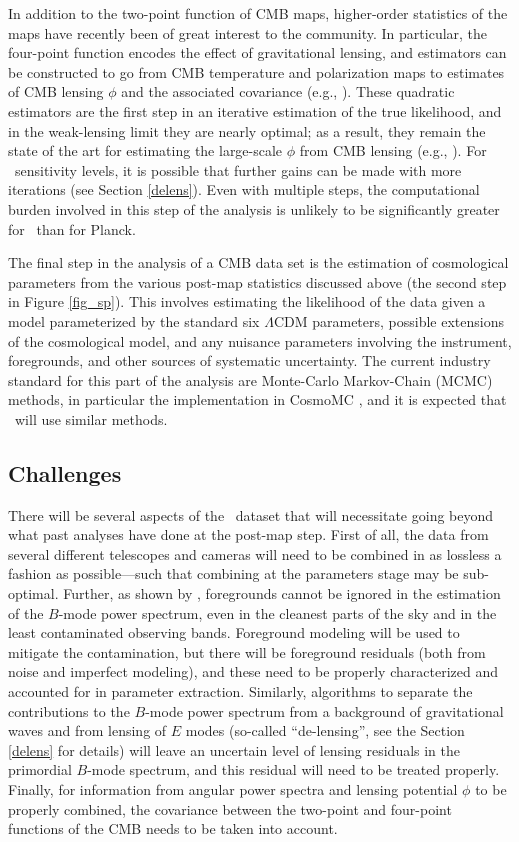 In addition to the two-point function of CMB maps, higher-order statistics of the maps have recently 
been of great interest to the community. In particular, the four-point function encodes the effect of 
gravitational lensing, and estimators can be constructed to go from CMB temperature and polarization
maps to estimates of CMB lensing $\phi$ and the associated covariance (e.g., \cite{Hu:2001kj,Okamoto:2003zw}).
These quadratic estimators are the first step in an iterative estimation of the true likelihood, and in
the weak-lensing limit they are nearly optimal; as a result, they remain the state of the art for estimating
the large-scale $\phi$ from CMB lensing (e.g., \cite{Ade:2013lta}). For \cmbexp\ sensitivity levels, 
it is possible that further gains can be made with more iterations (see Section \ref{delens}).
Even with multiple steps, the computational burden involved
in this step of the analysis is unlikely to be significantly greater for \cmbexp\ than for Planck.

The final step in the analysis of a CMB data set is the estimation of cosmological parameters from
the various post-map statistics discussed above (the second step in Figure \ref{fig_sp}). This involves estimating the likelihood of the data
given a model parameterized by the standard six $\Lambda$CDM parameters, possible extensions
of the cosmological model, and any nuisance parameters involving the instrument, foregrounds, and
other sources of systematic uncertainty. The current industry standard for this part of the analysis are
Monte-Carlo Markov-Chain (MCMC) methods, in particular the implementation in CosmoMC
\cite{Lewis:2002ah}, and it is expected that \cmbexp\ will use similar methods. 

\subsection{Challenges}
\label{se:challenges}
There will be several 
aspects of the \cmbexp\ dataset that will necessitate going beyond what past analyses
have done at the post-map step. First of all, the data from several different telescopes and cameras will need
to be combined in as lossless a fashion as possible---such that combining at the parameters stage
may be sub-optimal.
Further, as shown by \cite{Ade:2015tva}, foregrounds cannot be ignored in the 
estimation of the $B$-mode power spectrum, even in the cleanest parts of the sky and in the 
least contaminated observing bands. Foreground modeling will be used to mitigate the contamination,
but there will be foreground residuals (both from noise and imperfect modeling), and these need
to be properly characterized and accounted for in parameter extraction. 
Similarly, algorithms to separate the contributions to the $B$-mode power spectrum from a background of gravitational
waves and from lensing of $E$ modes (so-called ``de-lensing'', see the Section \ref{delens} for 
details) will leave an uncertain level of lensing residuals in the primordial $B$-mode spectrum, and
this residual will need to be treated properly. Finally, for information from angular power spectra
and lensing potential $\phi$ to be properly combined, the covariance between the two-point and
four-point functions of the CMB needs to be taken into account.

